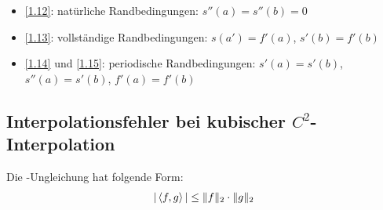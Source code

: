 \begin{*anmerkung}
	\begin{itemize}
		\item \cref{1.12}: natürliche Randbedingungen: $s''(a)=s''(b)=0$
		\item \cref{1.13}: vollständige Randbedingungen: $s(a')=f'(a)$, $s'(b)=f'(b)$
		\item \cref{1.14} und \cref{1.15}: periodische Randbedingungen: $s'(a)=s'(b)$, $s''(a)=s'(b)$, $f'(a)=f'(b)$
	\end{itemize}
\end{*anmerkung}

\subsection{Interpolationsfehler bei kubischer $C^2$-Interpolation}

\begin{*anmerkung}
	Die -Ungleichung hat folgende Form:
	\begin{align}
		\vert\left\langle f,g\right\rangle\vert \le \Vert f\Vert_2\cdot\Vert g\Vert_2\notag
	\end{align}
\end{*anmerkung}

